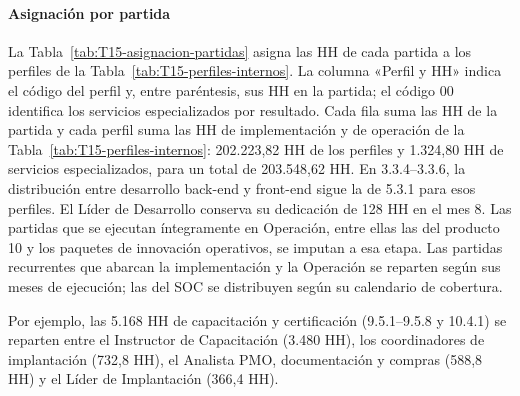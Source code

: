 \paragraph{Asignación por partida}
La Tabla~\ref{tab:T15-asignacion-partidas} asigna las HH de cada partida a los perfiles de la Tabla~\ref{tab:T15-perfiles-internos}. La columna «Perfil y HH» indica el código del perfil y, entre paréntesis, sus HH en la partida; el código 00 identifica los servicios especializados por resultado. Cada fila suma las HH de la partida y cada perfil suma las HH de implementación y de operación de la Tabla~\ref{tab:T15-perfiles-internos}: 202.223,82 HH de los perfiles y 1.324,80 HH de servicios especializados, para un total de 203.548,62 HH. En 3.3.4–3.3.6, la distribución entre desarrollo back-end y front-end sigue la de 5.3.1 para esos perfiles. El Líder de Desarrollo conserva su dedicación de 128 HH en el mes 8. Las partidas que se ejecutan íntegramente en Operación, entre ellas las del producto 10 y los paquetes de innovación operativos, se imputan a esa etapa. Las partidas recurrentes que abarcan la implementación y la Operación se reparten según sus meses de ejecución; las del SOC se distribuyen según su calendario de cobertura.

Por ejemplo, las 5.168 HH de capacitación y certificación (9.5.1–9.5.8 y 10.4.1) se reparten entre el Instructor de Capacitación (3.480 HH), los coordinadores de implantación (732,8 HH), el Analista PMO, documentación y compras (588,8 HH) y el Líder de Implantación (366,4 HH).

